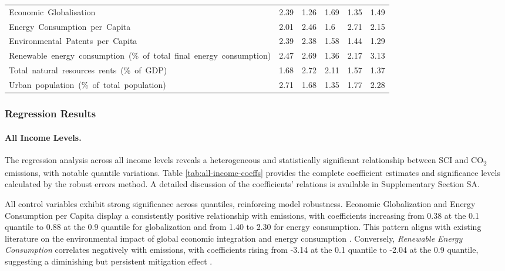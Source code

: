 \documentclass[10pt]{article}
\begin{document}
\begin{table}
\begin{adjustbox}{width=\textwidth,center}
\begin{tabular}{llllll}
      Economic\ Globalisation & 2.39 & 1.26 & 1.69 & 1.35 & 1.49 \\
      Energy\ Consumption\ per\ Capita & 2.01 & 2.46 & 1.6 & 2.71 & 2.15 \\
      Environmental\ Patents\ per\ Capita & 2.39 & 2.38 & 1.58 & 1.44 & 1.29 \\
      Renewable\ energy\ consumption\ (\%\ of\ total\ final\ energy\ consumption) & 2.47 & 2.69 & 1.36 & 2.17 & 3.13 \\
      Total\ natural\ resources\ rents\ (\%\ of\ GDP) & 1.68 & 2.72 & 2.11 & 1.57 & 1.37 \\
      Urban\ population\ (\%\ of\ total\ population) & 2.71 & 1.68 & 1.35 & 1.77 & 2.28 \\
      \bottomrule
      \end{tabular}
\end{adjustbox}
\end{table}


\subsubsection{Regression Results}
\paragraph{All Income Levels.}
The regression analysis across all income levels reveals a heterogeneous and statistically significant relationship between SCI and CO\textsubscript{2} emissions, with notable quantile variations. Table \ref{tab:all-income-coeffs} provides the complete coefficient estimates and significance levels calculated by the robust errors method. A detailed discussion of the coefficients' relations is available in Supplementary Section SA.

All control variables exhibit strong significance across quantiles, reinforcing model robustness. Economic Globalization and Energy Consumption per Capita display a consistently positive relationship with emissions, with coefficients increasing from 0.38 at the 0.1 quantile to 0.88 at the 0.9 quantile for globalization and from 1.40 to 2.30 for energy consumption. This pattern aligns with existing literature on the environmental impact of global economic integration and energy consumption \citep{KAIS20161101}. Conversely, \textit{Renewable Energy Consumption} correlates negatively with emissions, with coefficients rising from -3.14 at the 0.1 quantile to -2.04 at the 0.9 quantile, suggesting a diminishing but persistent mitigation effect \citep{Jaforullah2015Does}.
\end{document}
